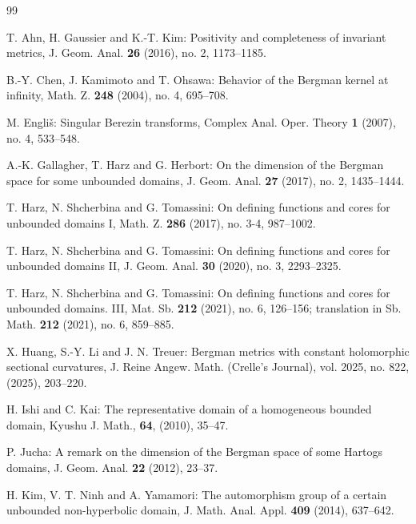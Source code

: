 \documentclass[12pt]{amsart}
\numberwithin{equation}{section}
\theoremstyle{definition}
\theoremstyle{remark}
\newcommand{\1}{{\bf 1}}
\begin{document}
\begin{thebibliography}{99}

T. Ahn, H. Gaussier and K.-T. Kim: 
 Positivity and completeness of invariant metrics, 
J. Geom. Anal. {\bf 26} (2016), no. 2, 1173--1185.

B.-Y. Chen, J. Kamimoto and T. Ohsawa:
Behavior of the Bergman kernel at infinity,  
Math. Z. {\bf 248} 
(2004), no. 4, 695--708. 

M. Engli\v{s}: 
Singular Berezin transforms, 
Complex Anal. Oper. Theory {\bf 1} (2007), no. 4, 
533--548.


A.-K. Gallagher, T. Harz and G. Herbort:
On the dimension of the Bergman space 
for some unbounded domains, 
J. Geom. Anal. {\bf 27} (2017), no. 2, 1435--1444.

T. Harz, N. Shcherbina and G. Tomassini:
On defining functions and cores for unbounded domains I, 
Math. Z. {\bf 286} (2017), no. 3-4, 987--1002.

T. Harz, N. Shcherbina and G. Tomassini:
 On defining functions and cores for unbounded domains II, 
J. Geom. Anal. {\bf 30} (2020), no. 3, 2293--2325.

T. Harz, N. Shcherbina and G. Tomassini:
On defining functions and cores for unbounded domains. III, 
Mat. Sb. {\bf 212} (2021), no. 6, 126--156; translation in
Sb. Math. {\bf 212} (2021), no. 6, 859--885.

X. Huang, S.-Y. Li and J. N. Treuer:
Bergman metrics with constant 
holomorphic sectional curvatures, 
J. Reine Angew. Math.
(Crelle's Journal), vol. 2025, no. 822, (2025), 
203--220. 

H. Ishi and C. Kai:
The representative domain of a homogeneous
bounded domain, 
Kyushu J. Math., {\bf 64}, (2010), 
35--47. 


P. Jucha: 
A remark on the dimension 
of the Bergman space of some Hartogs domains, 
J. Geom. Anal. {\bf 22} (2012), 
23--37. 



H. Kim, V. T. Ninh and A. Yamamori: 
The automorphism group of a certain 
unbounded non-hyperbolic domain, 
J. Math. Anal. Appl. {\bf 409} (2014), 
637--642.


\end{thebibliography}
\end{document}
